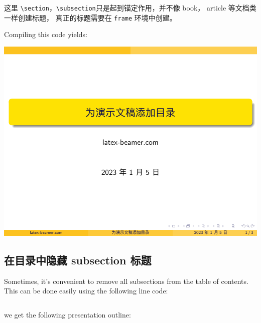 \inputminted[linenos=true]{latex}{examples/beamer/outline.tex}

\begin{remark*}
  这里 \verb|\section|，\verb|\subsection|只是起到锚定作用，并不像 book， article 等文档类一样创建标题，
  真正的标题需要在 \verb|frame| 环境中创建。
\end{remark*}

Compiling this code yields:

\includegraphics[page=2]{examples/beamer/outline.pdf}

\subsection{在目录中隐藏 {\ttfamily subsection} 标题}

Sometimes, it’s convenient to remove all subsections from the table of contents. This can be done easily using the following line code:

\inputminted[linenos=true]{latex}{examples/beamer/outline-hidesubsections.tex}

we get the following presentation outline:

